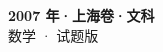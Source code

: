 \documentclass[zihao=-4, a4paper]{ctexart}
\begin{document}
\begin{center}
  {\Large\bfseries 2007 年·上海卷·文科}\\[4pt]
  {\large 数学 · 试题版}
\end{center}
\medskip
{}

\end{document}
